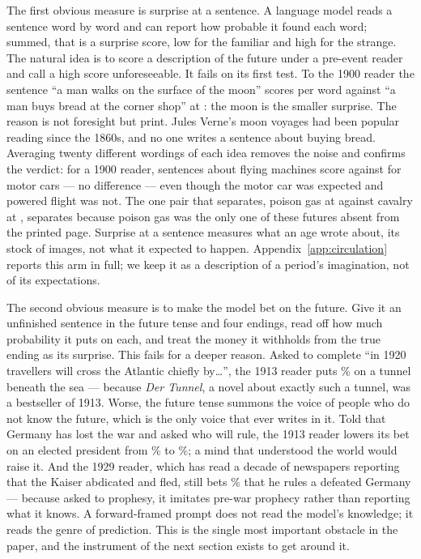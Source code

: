 \documentclass[11pt]{article}
\begin{document}
The first obvious measure is surprise at a sentence. A language model reads a sentence word by word and can
report how probable it found each word; summed, that is a surprise score, low for the familiar and high for
the strange. The natural idea is to score a description of the future under a pre-event reader and call a
high score unforeseeable. It fails on its first test. To the 1900 reader the sentence ``a man walks on the
surface of the moon'' scores \NmoonNineHundred{} per word against ``a man buys bread at the corner shop''
at \NbreadNineHundred{}: the moon is the smaller surprise. The reason is not foresight but print. Jules
Verne's moon voyages had been popular reading since the 1860s, and no one writes a sentence about buying
bread. Averaging twenty different wordings of each idea removes the noise and confirms the verdict: for a
1900 reader, sentences about flying machines score \NplaneNov{} against \NplaneFam{} for motor cars --- no
difference --- even though the motor car was expected and powered flight was not. The one pair that
separates, poison gas at \NgasNov{} against cavalry at \NgasFam{}, separates because poison gas was the
only one of these futures absent from the printed page. Surprise at a sentence measures what an age wrote
about, its stock of images, not what it expected to happen. Appendix~\ref{app:circulation} reports this arm
in full; we keep it as a description of a period's imagination, not of its expectations.

The second obvious measure is to make the model bet on the future. Give it an unfinished sentence in the
future tense and four endings, read off how much probability it puts on each, and treat the money it
withholds from the true ending as its surprise. This fails for a deeper reason. Asked to complete ``in 1920
travellers will cross the Atlantic chiefly by\ldots'', the 1913 reader puts \NtunnelP\% on a tunnel beneath
the sea --- because \emph{Der Tunnel}, a novel about exactly such a tunnel, was a bestseller of 1913.
Worse, the future tense summons the voice of people who do not know the future, which is the only voice
that ever writes in it. Told that Germany has lost the war and asked who will rule, the 1913 reader lowers
its bet on an elected president from \NpresUncond\% to \NpresDefeat\%; a mind that understood the world
would raise it. And the 1929 reader, which has read a decade of newspapers reporting that the Kaiser
abdicated and fled, still bets \NkaiserTwentyNine\% that he rules a defeated Germany --- because asked to
prophesy, it imitates pre-war prophecy rather than reporting what it knows. A forward-framed prompt does
not read the model's knowledge; it reads the genre of prediction. This is the single most important
obstacle in the paper, and the instrument of the next section exists to get around it.
\end{document}
